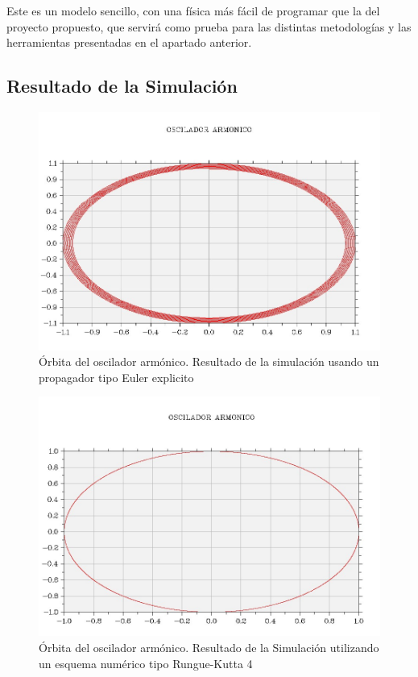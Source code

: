 \documentclass[11pt,singlespacing,liststotoc,headsepline,a4paper]{article}
\begin{document}
Este es un modelo sencillo, con una física más fácil de programar que la del proyecto propuesto, que servirá como prueba para las distintas metodologías y las herramientas presentadas en el apartado anterior. 

\subsection{Resultado de la Simulación}

\begin{figure}[H]
	\centering
	\includegraphics[width=1\textwidth]{armonio_EU.JPG}
	\caption{Órbita del oscilador armónico. Resultado de la simulación usando un propagador tipo Euler explicito}
	\label{Armonico_EU}
\end{figure}

\begin{figure}[H]
	\centering
	\includegraphics[width=1\textwidth]{Armonio_RG4.JPG}
	\caption{Órbita del oscilador armónico. Resultado de la Simulación utilizando un esquema numérico tipo Rungue-Kutta 4}
	\label{Armonico_RG4}
\end{figure}
\end{document}
